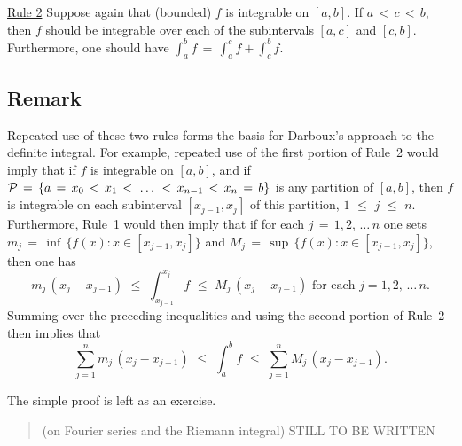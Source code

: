         \underline{Rule 2} Suppose again that (bounded) $f$ is integrable on $[a,b]$.
    If $a\,<\,c\,<\,b$, then $f$ should be integrable over each of the subintervals $[a,c]$ and $[c,b]$.
    Furthermore, one should have ${\displaystyle \int_{a}^{b} f \,=\, \int_{a}^{c} f + \int_{c}^{b} f}$.

\V

        \subsection{\small{{\bf Remark}}}
        \label{RemrkH20.15}

\V

        Repeated use of these two rules forms the basis for Darboux's approach to the definite integral.
    For example, repeated use of the first portion of Rule~2 would imply that if $f$ is integrable on $[a,b]$,
    and if ${\cal P} \,=\, \{a \,=\, x_{0}\,<\,x_{1}\,<\,\,{\ldots}\,\,<\,x_{n-1}\,<\,x_{n} \,=\, b\}$ is any partition of $[a,b]$,
    then $f$ is integrable on each subinterval $[x_{j-1},x_{j}]$ of this partition, $1\,\,{\leq}\,\,j\,\,{\leq}\,\,n$.
    Furthermore, Rule~1 would then imply that if for each $j \,=\, 1,2,\,{\ldots}\,n$
    one sets $m_{j} \,=\, {\inf}\,\{f(x):x{\in}[x_{j-1},x_{j}]\}$ and $M_{j} \,=\, {\sup}\,\{f(x): x{\in}[x_{j-1},x_{j}]\}$, then one has
        \begin{displaymath}
        m_{j}\,(x_{j}-x_{j-1})\,\,{\leq}\,\,\int_{x_{j-1}}^{x_{j}} f\,\,{\leq}\,\,M_{j}\,(x_{j}-x_{j-1}) \mbox{ for each $j=1,2,\,{\ldots}\,n$}.
        \end{displaymath}
    Summing over the preceding inequalities and using the second portion of Rule~2 then implies that
        \begin{displaymath}
        \sum_{j=1}^{n} m_{j}\,(x_{j}-x_{j-1})
    \,\,{\leq}\,\,
        \int_{a}^{b} f
    \,\,{\leq}\,\,
        \sum_{j=1}^{n} M_{j}\,(x_{j}-x_{j-1}). %
        \end{displaymath}

        The simple proof is left as an exercise. %

\VV

\begin{quotation}
{\footnotesize \underline{\Note} (on Fourier series and the Riemann integral)
STILL TO BE WRITTEN
}%
\end{quotation}

